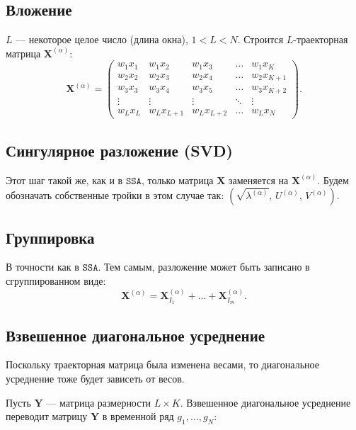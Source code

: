 \documentclass[12pt, specialist, subf
]{disser}
\theoremstyle{definition}
\newcommand{\SSA}{\texttt{SSA}}
\begin{document}
\subsection*{Вложение}
$L$ --- некоторое целое число (длина окна), $1 < L < N$. Строится $L$-траекторная матрица $\mathbf{X}^{(\alpha)}$:
\begin{equation}
	\label{eq:X_alpha}
	\mathbf{X}^{(\alpha)} =
	\begin{pmatrix}
		w_1 x_1   & w_1 x_2     & w_1 x_3     & \dots  & w_1 x_{K}   \\
		w_2 x_2   & w_2 x_3     & w_2 x_4     & \dots  & w_2 x_{K+1} \\
		w_3 x_3   & w_3 x_4     & w_3 x_5     & \dots  & w_3 x_{K+2} \\
		\vdots    & \vdots      & \vdots      & \ddots & \vdots      \\
		w_L x_{L} & w_L x_{L+1} & w_L x_{L+2} & \dots  & w_L x_{N}
	\end{pmatrix}.
\end{equation}

\subsection*{Сингулярное разложение (SVD)}
Этот шаг такой же, как и в $\SSA$, только матрица $\mathbf{X}$ заменяется на $\mathbf{X}^{(\alpha)}$. Будем обозначать собственные тройки в этом случае так: $(\sqrt{\lambda^{(\alpha)}},\,U^{(\alpha)},\,V^{(\alpha)})$.

\subsection*{Группировка}
В точности как в $\SSA$. Тем самым, разложение может быть записано в сгруппированном виде:
\begin{equation*}
	\mathbf{X}^{(\alpha)} = \mathbf{X}^{(\alpha)}_{I_1} + \dots + \mathbf{X}^{(\alpha)}_{I_m}.
\end{equation*}

\subsection*{Взвешенное диагональное усреднение}
Поскольку траекторная матрица была изменена весами, то диагональное усреднение тоже будет зависеть от весов.

Пусть $\mathbf{Y}$ --- матрица размерности $L \times K$. Взвешенное диагональное усреднение переводит матрицу $\mathbf{Y}$ в временной ряд $g_1, \dots, g_{N} $:
\end{document}

